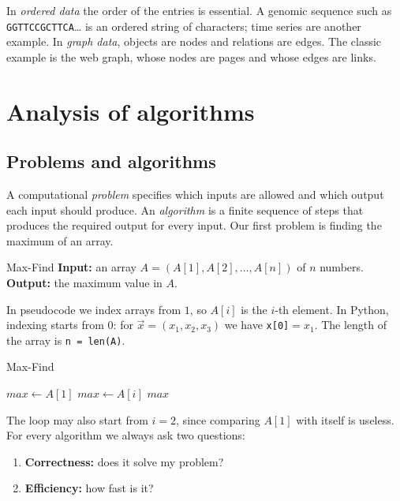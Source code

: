 \documentclass[a4paper,12pt,oneside]{report}
\begin{document}
In \emph{ordered data} the order of the entries is essential. A genomic
sequence such as \texttt{GGTTCCGCTTCA}\ldots{} is an ordered string of
characters; time series are another example. In \emph{graph data},
objects are nodes and relations are edges. The classic example is the
web graph, whose nodes are pages and whose edges are links.

\chapter{Analysis of algorithms}

\section{Problems and algorithms}

A computational \emph{problem} specifies which inputs are allowed and
which output each input should produce. An \emph{algorithm} is a finite
sequence of steps that produces the required output for every input.
Our first problem is finding the maximum of an array.

\begin{framedproblem}{Max-Find}\label{prob:max-find}
\textbf{Input:} an array $A=(A[1],A[2],\ldots,A[n])$ of $n$ numbers.\\
\textbf{Output:} the maximum value in $A$.
\end{framedproblem}

\begin{notebox}[Indexing]
In pseudocode we index arrays from $1$, so $A[i]$ is the $i$-th
element. In Python, indexing starts from $0$: for
$\vec{x}=(x_1,x_2,x_3)$ we have \texttt{x[0]}${}=x_1$. The length of
the array is \texttt{n = len(A)}.
\end{notebox}

\begin{framedalgo}{Max-Find}\label{alg:max-find}
\begin{algorithmic}[1]
    \State $\mathit{max}\gets A[1]$
        \State $\mathit{max}\gets A[i]$
      \EndIf
    \EndFor
    \State \Return $\mathit{max}$
  \EndFunction
\end{algorithmic}
\end{framedalgo}

The loop may also start from $i=2$, since comparing $A[1]$ with itself
is useless. For every algorithm we always ask two questions:
\begin{enumerate}
  \item \textbf{Correctness:} does it solve my problem?
  \item \textbf{Efficiency:} how fast is it?
\end{enumerate}
\end{document}
